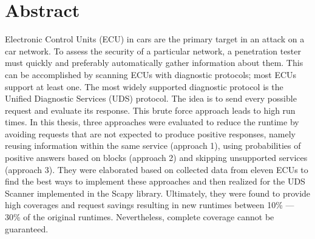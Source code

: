\chapter*{\centering Abstract}

Electronic Control Units (ECU) in cars are the primary target in an attack on a car network. To assess the security of a particular network, a penetration tester must quickly and preferably automatically gather information about them. This can be accomplished by scanning ECUs with diagnostic protocols; most ECUs support at least one. The most widely supported diagnostic protocol is the Unified Diagnostic Services (UDS) protocol. The idea is to send every possible request and evaluate its response. This brute force approach leads to high run times. In this thesis, three approaches were evaluated to reduce the runtime by avoiding requests that are not expected to produce positive responses, namely reusing information within the same service (approach 1), using probabilities of positive answers based on blocks (approach 2) and skipping unsupported services (approach 3). They were elaborated based on collected data from eleven ECUs to find the best ways to implement these approaches and then realized for the UDS Scanner implemented in the Scapy library. Ultimately, they were found to provide high coverages and request savings resulting in new runtimes between 10\% — 30\% of the original runtimes. Nevertheless, complete coverage cannot be guaranteed.
